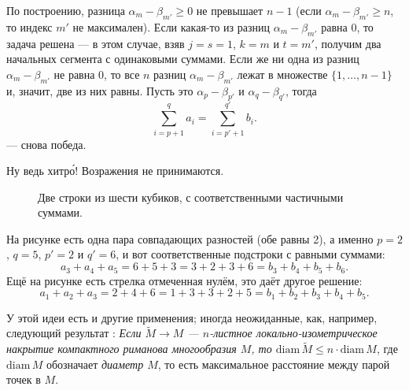 По построению, разница $\alpha_m-\beta_{m'}\ge 0$ не превышает $n-1$ 
(если $\alpha_m-\beta_{m'}\ge n$, то индекс $m'$ не максимален).
Если какая-то из разниц $\alpha_m-\beta_{m'}$ равна $0$, то задача решена --- в этом случае, взяв $j=s=1$, $k=m$ и $t=m'$, получим два начальных сегмента с одинаковыми суммами.
Если же ни одна из разниц $\alpha_m-\beta_{m'}$ не равна $0$, то все $n$ разниц 
$\alpha_m-\beta_{m'}$ лежат в множестве $\{1,\dots,n-1\}$ и, значит, две из них равны.
Пусть это $\alpha_p-\beta_{p'}$ и $\alpha_q-\beta_{q'}$, тогда 
\[\sum_{i=p+1}^qa_i=\sum_{i=p'+1}^{q'}b_i.\]
--- снова победа.

Ну ведь хитр\'{о}!
Возражения не принимаются.

\begin{figure}[h!]
\centering
{}
\caption{Две строки из шести кубиков, с соответственными частичными суммами.}
\label{pic:kubiki}
\end{figure}

На рисунке есть одна пара совпадающих разностей (обе равны 2), а именно $p=2$, $q=5$, $p'=2$ и $q'=6$, и
вот соответственные подстроки с равными суммами:
\[a_3+a_4+a_5=6+5+3=3+2+3+6=b_3+b_4+b_5+b_6.\]
Ещё на рисунке есть стрелка отмеченная нулём, это даёт другое решение:
\[a_1+a_2+a_3=2+4+6=1+3+3+2+5=b_1+b_2+b_3+b_4+b_5.\]

\begin{addedbytheeditors}
У этой идеи есть и другие применения; иногда неожиданные, как, например, следующий результат \cite{petrunin}:
\textit{Если $\tilde M\to M$ --- $n$-листное локально-изометрическое накрытие компактного риманова многообразия $M$, то $\mathrm{diam}\, \tilde M\le n\cdot \mathrm{diam}\, M$}, где $\mathrm{diam}\, M$ обозначает \textit{диаметр $M$}, то есть максимальное расстояние между парой точек в $M$.\pr
\end{addedbytheeditors}


